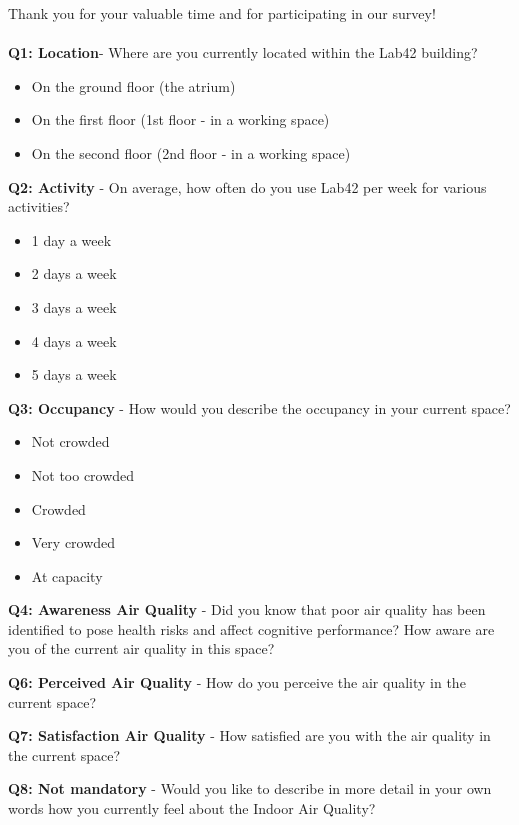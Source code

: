 \begin{appendices}
Thank you for your valuable time and for participating in our survey!\\\\

\textbf{Q1: Location}- Where are you currently located within the Lab42 building?

\begin{itemize}
    \item On the ground floor (the atrium)
    \item On the first floor (1st floor - in a working space)
    \item On the second floor (2nd floor - in a working space)
\end{itemize}

\textbf{Q2: Activity} - On average, how often do you use Lab42 per week for various activities?

\begin{itemize}
    \item 1 day a week
    \item 2 days a week
    \item 3 days a week
    \item 4 days a week
    \item 5 days a week
\end{itemize}

\textbf{Q3: Occupancy} - How would you describe the occupancy in your current space?

\begin{itemize}
    \item Not crowded
    \item Not too crowded
    \item Crowded
    \item Very crowded
    \item At capacity
\end{itemize}

\textbf{Q4: Awareness Air Quality} - Did you know that poor air quality has been identified to pose health risks and affect cognitive performance? How aware are you of the current air quality in this space?

\textbf{Q6: Perceived Air Quality} - How do you perceive the air quality in the current space?

\textbf{Q7: Satisfaction Air Quality} - How satisfied are you with the air quality in the current space?

\textbf{Q8: Not mandatory} - Would you like to describe in more detail in your own words how you currently feel about the Indoor Air Quality?


\end{appendices}
